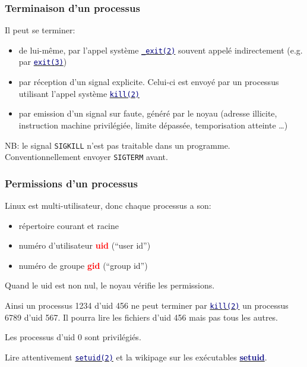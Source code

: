 \documentclass[lualatex,11pt,a4paper,svgnames,french]{beamer}
\newcommand{\clbrougras}[1]{{\textcolor{Red}{\textbf{#1}}}}
\begin{document}
\begin{frame}\frametitle{Terminaison d'un processus}
  Il peut se terminer:
  \begin{itemize}
    \item de lui-même, par l'appel système 
  {\href{https://man7.org/linux/man-pages/man2/_exit.2.html}{\texttt{\textcolor{Navy}{\_exit(2)}}}} souvent appelé indirectement (e.g. par 
  {\href{https://man7.org/linux/man-pages/man3/exit.3.html}{\texttt{\textcolor{Navy}{exit(3)}}}})
  \item par réception d'un signal explicite. Celui-ci est envoyé par un processus utilisant l'appel système
  {\href{https://man7.org/linux/man-pages/man2/kill.2.html}{\texttt{\textcolor{Navy}{kill(2)}}}}
  \item par emission d'un signal sur faute, généré par le noyau
    (adresse illicite, instruction machine privilégiée, limite
    dépassée, temporisation atteinte \ldots)
  \end{itemize}

  NB: le signal \texttt{SIGKILL} n'est pas traitable dans un
  programme. Conventionnellement envoyer \texttt{SIGTERM} avant.
\end{frame}
\begin{frame}\frametitle{Permissions d'un processus}

  Linux est multi-utilisateur, donc chaque processus a son:

  \begin{itemize}
  \item répertoire courant et racine
  \item numéro d'utilisateur \clbrougras{uid} (``user id'')
  \item numéro de groupe \clbrougras{gid} (``group id'')
  \end{itemize}

  Quand le uid est non nul, le noyau vérifie les permissions.

\medskip
Ainsi un
processus 1234 d'uid 456 ne peut terminer par
{\href{https://man7.org/linux/man-pages/man2/kill.2.html}{\texttt{\textcolor{Navy}{kill(2)}}}}
  un processus 6789 d'uid 567.  Il pourra lire les fichiers d'uid 456
  mais pas tous les autres.

  \medskip

  Les processus d'uid 0 sont privilégiés.

\medskip
  Lire attentivement
  {\href{https://man7.org/linux/man-pages/man2/setuid.2.html}{\texttt{\textcolor{Navy}{setuid(2)}}}}
  et la wikipage sur les exécutables 
{\href{https://fr.wikipedia.org/wiki/Setuid}{\textbf{\textcolor{Navy}{setuid}}}}.
  
\end{frame}
\end{document}
